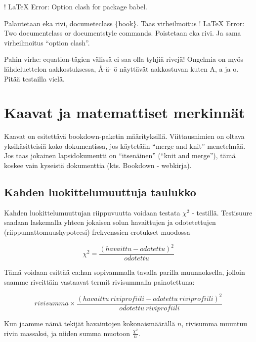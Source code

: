 \documentclass[finnish,]{book}
\theoremstyle{definition}
\theoremstyle{definition}
\theoremstyle{definition}
\theoremstyle{remark}
\begin{document}
! LaTeX Error: Option clash for package babel.

Palautetaan eka rivi, documeteclass \{book\}. Taas virheilmoitus ! LaTeX
Error: Two documentclass or documentstyle commands. Poistetaan eka rivi.
Ja sama virheilmoitus ``option clash''.

Pahin virhe: equation-tägien välissä ei saa olla tyhjiä rivejä! Ongelmia
on myös lähdeluettelon aakkostuksessa, Å-ä- ö näyttävät aakkostuvan
kuten A, a ja o. Pitää testailla vielä.

\hypertarget{kaavat-ja-matemattiset-merkinnat}{%
\chapter{Kaavat ja matemattiset
merkinnät}\label{kaavat-ja-matemattiset-merkinnat}}

Kaavat on esitettävä bookdown-paketin määrityksillä. Viittausnimien on
oltava yksikäsitteisiä koko dokumentissa, jos käytetään ``merge and
knit'' menetelmää. Jos taas jokainen lapsidokumentti on ``itsenäinen''
(``knit and merge''), tämä koskee vain kyseistä dokumenttia (kts.
Bookdown - webkirja).

\hypertarget{kahden-luokittelumuuttuja-taulukko}{%
\section{Kahden luokittelumuuttuja
taulukko}\label{kahden-luokittelumuuttuja-taulukko}}

Kahden luokittelumuuttujan riippuvuutta voidaan testata \(\chi^{2}\) -
testillä. Testisuure saadaan laskemalla yhteen jokaisen solun
havaittujen ja odotetettujen (riippumattomuushypoteesi) frekvenssien
erotukset muodossa

\begin{equation}
  \chi^{2} = \frac{(havaittu - odotettu)^2} {odotettu}
  \label{eq:khii21}
\end{equation}

Tämä voidaan esittää ca:han sopivammalla tavalla parilla muunnoksella,
jolloin saamme riveittäin vastaavat termit rivisummalla painotettuna:

\begin{equation}
  rivisumma \times \frac{(havaittu \: riviprofiili - odotettu \: riviprofiili)^2} {odotettu \: riviprofiili}
  \label{eq:khii22}
\end{equation}

Kun jaamme nämä tekijät havaintojen kokonaismäärällä \(n\), rivisumma
muuntuu rivin massaksi, ja niiden summa muotoon \(\frac{\chi^{2}}{n}\).
\end{document}
